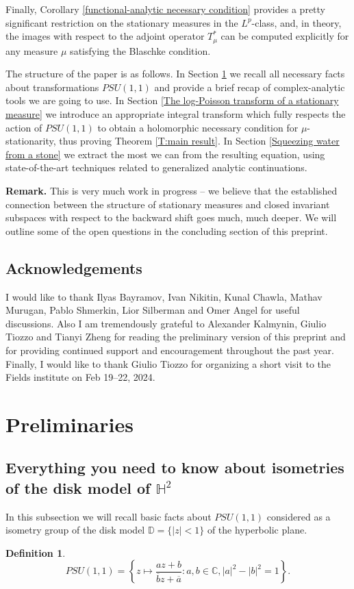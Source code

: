 \documentclass[11pt]{article}
\newtheorem{definition}{Definition}[section]
\begin{document}
Finally, Corollary \ref{functional-analytic necessary condition} provides a pretty significant restriction on the stationary measures in the $L^p$-class, and, in theory, the images with respect to the adjoint operator $T_\mu^*$ can be computed explicitly for any measure $\mu$ satisfying the Blaschke condition.

The structure of the paper is as follows. In Section \ref{Preliminaries} we recall all necessary facts about transformations $PSU(1,1)$ and provide a brief recap of complex-analytic tools we are going to use. In Section \ref{The log-Poisson transform of a stationary measure} we introduce an appropriate integral transform which fully respects the action of $PSU(1,1)$ to obtain a holomorphic necessary condition for $\mu$-stationarity, thus proving Theorem \ref{T:main result}. In Section \ref{Squeezing water from a stone} we extract the most we can from the resulting equation, using state-of-the-art techniques related to generalized analytic continuations.

\textbf{Remark.} This is very much work in progress -- we believe that the established connection between the structure of stationary measures and closed invariant subspaces with respect to the backward shift goes much, much deeper. We will outline some of the open questions in the concluding section of this preprint.

\subsection{Acknowledgements}
I would like to thank Ilyas Bayramov, Ivan Nikitin, Kunal Chawla, Mathav Murugan, Pablo Shmerkin, Lior Silberman and Omer Angel for useful discussions. Also I am tremendously grateful to Alexander Kalmynin, Giulio Tiozzo and Tianyi Zheng for reading the preliminary version of this preprint and for providing continued support and encouragement throughout the past year. Finally, I would like to thank Giulio Tiozzo for organizing a short visit to the Fields institute on Feb 19--22, 2024.

\section{Preliminaries}
\label{Preliminaries}
\subsection{Everything you need to know about isometries of the disk model of $\mathbb{H}^2$}
In this subsection we will recall basic facts about $PSU(1,1)$ considered as a isometry group of the disk model $\mathbb{D} = \{ |z| < 1 \}$ of the hyperbolic plane. 
\begin{definition}
	\[
	PSU(1,1) = \left\lbrace z \mapsto \frac{az + b}{\overline{b} z + \overline{a}} : a, b \in \mathbb{C}, |a|^2 - |b|^2 = 1 \right\rbrace.
	\]
\end{definition}
\end{document}
